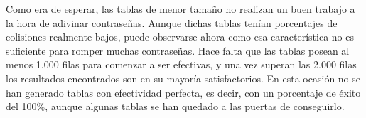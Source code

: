 \documentclass[12pt,spanish,listoffigures,listoftables,listofalgorithms]{tfgetsinf}
\begin{document}
\def\arraystretch{1.5}
\begin{table}[H]
	\centering
	\caption{Porcentajes de éxito para las tablas que emplean \textbf{R1}}
	\label{exR1}
\end{table}

Como era de esperar, las tablas de menor tamaño no realizan un buen trabajo a la hora de adivinar contraseñas. Aunque dichas tablas tenían porcentajes de colisiones realmente bajos, puede observarse ahora como esa característica no es suficiente para romper muchas contraseñas. Hace falta que las tablas posean al menos 1.000 filas para comenzar a ser efectivas, y una vez superan las 2.000 filas los resultados encontrados son en su mayoría satisfactorios. En esta ocasión no se han generado tablas con efectividad perfecta, es decir, con un porcentaje de éxito del 100\%, aunque algunas tablas se han quedado a las puertas de conseguirlo.
\end{document}
